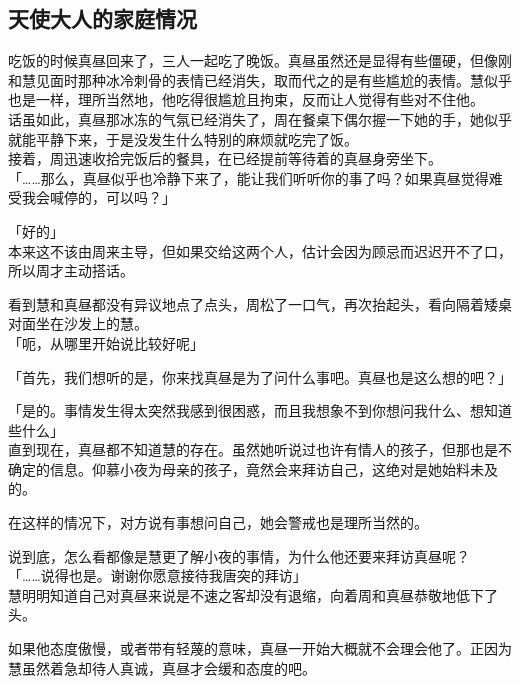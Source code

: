 \subsection{天使大人的家庭情况}

吃饭的时候真昼回来了，三人一起吃了晚饭。真昼虽然还是显得有些僵硬，但像刚和慧见面时那种冰冷刺骨的表情已经消失，取而代之的是有些尴尬的表情。慧似乎也是一样，理所当然地，他吃得很尴尬且拘束，反而让人觉得有些对不住他。\\

话虽如此，真昼那冰冻的气氛已经消失了，周在餐桌下偶尔握一下她的手，她似乎就能平静下来，于是没发生什么特别的麻烦就吃完了饭。\\

接着，周迅速收拾完饭后的餐具，在已经提前等待着的真昼身旁坐下。\\

「……那么，真昼似乎也冷静下来了，能让我们听听你的事了吗？如果真昼觉得难受我会喊停的，可以吗？」

「好的」\\

本来这不该由周来主导，但如果交给这两个人，估计会因为顾忌而迟迟开不了口，所以周才主动搭话。

看到慧和真昼都没有异议地点了点头，周松了一口气，再次抬起头，看向隔着矮桌对面坐在沙发上的慧。\\

「呃，从哪里开始说比较好呢」

「首先，我们想听的是，你来找真昼是为了问什么事吧。真昼也是这么想的吧？」

「是的。事情发生得太突然我感到很困惑，而且我想象不到你想问我什么、想知道些什么」\\

直到现在，真昼都不知道慧的存在。虽然她听说过也许有情人的孩子，但那也是不确定的信息。仰慕小夜为母亲的孩子，竟然会来拜访自己，这绝对是她始料未及的。

在这样的情况下，对方说有事想问自己，她会警戒也是理所当然的。

说到底，怎么看都像是慧更了解小夜的事情，为什么他还要来拜访真昼呢？\\

「……说得也是。谢谢你愿意接待我唐突的拜访」\\

慧明明知道自己对真昼来说是不速之客却没有退缩，向着周和真昼恭敬地低下了头。

如果他态度傲慢，或者带有轻蔑的意味，真昼一开始大概就不会理会他了。正因为慧虽然着急却待人真诚，真昼才会缓和态度的吧。\\


